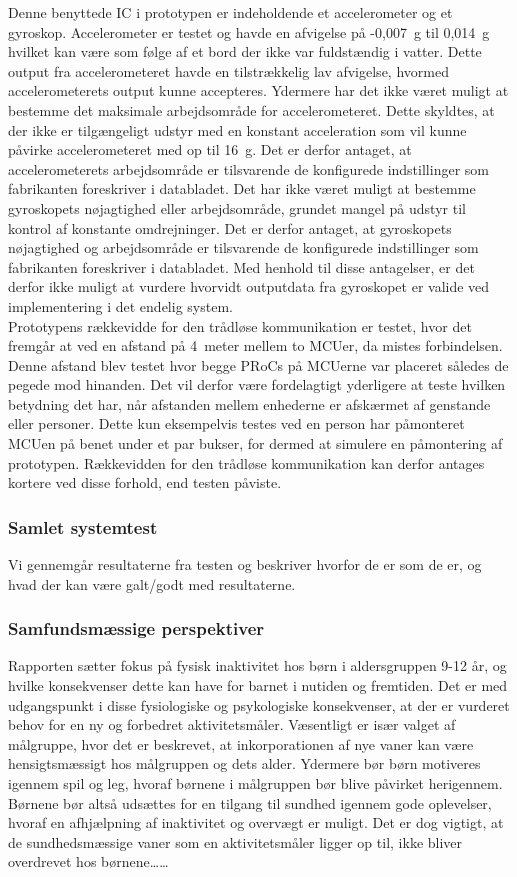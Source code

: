 Denne benyttede IC i prototypen er indeholdende et accelerometer og et gyroskop. Accelerometer er testet og havde en afvigelse på -0,007~g til 0,014~g hvilket kan være som følge af et bord der ikke var fuldstændig i vatter. Dette output fra accelerometeret havde en tilstrækkelig lav afvigelse, hvormed accelerometerets output kunne accepteres. Ydermere har det ikke været muligt at bestemme det maksimale arbejdsområde for accelerometeret. Dette skyldtes, at der ikke er tilgængeligt udstyr med en konstant acceleration som vil kunne påvirke accelerometeret med op til 16~g. Det er derfor antaget, at accelerometerets arbejdsområde er tilsvarende de konfigurede indstillinger som fabrikanten foreskriver i databladet. Det har ikke været muligt at bestemme gyroskopets nøjagtighed eller arbejdsområde, grundet mangel på udstyr til kontrol af konstante omdrejninger. Det er derfor antaget, at gyroskopets nøjagtighed og arbejdsområde er tilsvarende de konfigurede indstillinger som fabrikanten foreskriver i databladet. Med henhold til disse antagelser, er det derfor ikke muligt at vurdere hvorvidt outputdata fra gyroskopet er valide ved implementering i det endelig system. \\
Prototypens rækkevidde for den trådløse kommunikation er testet, hvor det fremgår at ved en afstand på 4~meter mellem to MCUer, da mistes forbindelsen. Denne afstand blev testet hvor begge PRoCs på MCUerne var placeret således de pegede mod hinanden. Det vil derfor være fordelagtigt yderligere at teste hvilken betydning det har, når afstanden mellem enhederne er afskærmet af genstande eller personer. Dette kun eksempelvis testes ved en person har påmonteret MCUen på benet under et par bukser, for dermed at simulere en påmontering af prototypen. Rækkevidden for den trådløse kommunikation kan derfor antages kortere ved disse forhold, end testen påviste.

\subsubsection{Samlet systemtest}
Vi gennemgår resultaterne fra testen og beskriver hvorfor de er som de er, og hvad der kan være galt/godt med resultaterne.

\subsubsection{Samfundsmæssige perspektiver}
Rapporten sætter fokus på fysisk inaktivitet hos børn i aldersgruppen 9-12 år, og hvilke konsekvenser dette kan have for barnet i nutiden og fremtiden. Det er med udgangspunkt i disse fysiologiske og psykologiske konsekvenser, at der er vurderet behov for en ny og forbedret aktivitetsmåler. Væsentligt er især valget af målgruppe, hvor det er beskrevet, at inkorporationen  af nye vaner kan være hensigtsmæssigt hos målgruppen og dets alder. Ydermere bør børn motiveres igennem spil og leg, hvoraf børnene i målgruppen bør blive påvirket herigennem. Børnene bør altså udsættes for en tilgang til sundhed igennem gode oplevelser, hvoraf en afhjælpning af inaktivitet og overvægt er muligt. Det er dog vigtigt, at de sundhedsmæssige vaner som en aktivitetsmåler ligger op til, ikke bliver overdrevet hos børnene……
